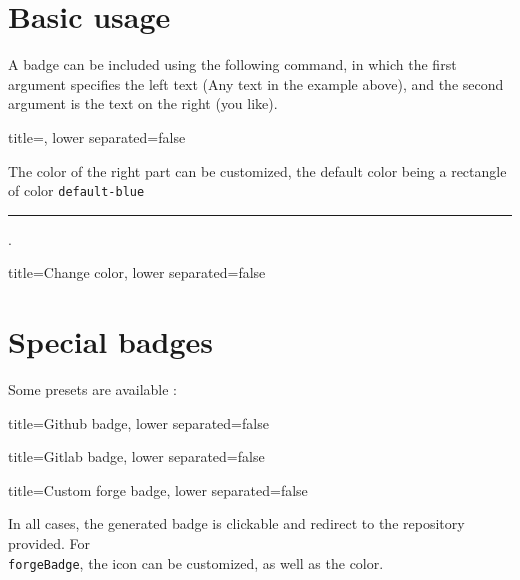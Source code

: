 \section{Basic usage}

A badge can be included using the following command, in which the first argument specifies the left text (\textsf{Any text} in the example above), and the second argument is the text on the right (\textsf{you like}).

\begin{tcblisting}{title={\tikzshield}, lower separated=false}
\end{tcblisting}

The color of the right part can be customized, the default color being a rectangle of color \texttt{default-blue} \textcolor{default-blue}{\rule{1em}{1em}}.


\begin{tcblisting}{title={Change color}, lower separated=false}
\end{tcblisting}




\section{Special badges}


Some presets are available :

\begin{tcblisting}{title={Github badge}, lower separated=false}
\end{tcblisting}

\begin{tcblisting}{title={Gitlab badge}, lower separated=false}
\end{tcblisting}

\begin{tcblisting}{title={Custom forge badge}, lower separated=false}
\end{tcblisting}

In all cases, the generated badge is clickable and redirect to the repository provided.
For \texttt{\\forgeBadge}, the icon can be customized, as well as the color.
